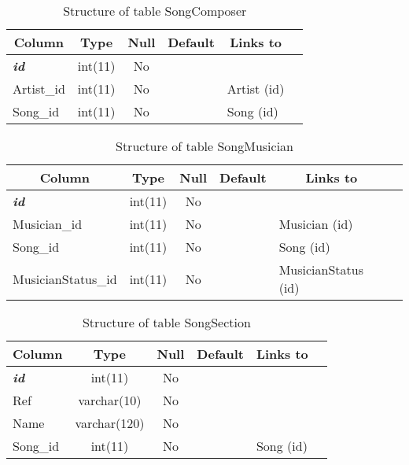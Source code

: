 %
%
 \begin{longtable}{|l|c|c|c|l|l|} 
 \caption{Structure of table SongComposer} \label{tab:SongComposer-structure} \\
 \hline \multicolumn{1}{|c|}{\textbf{Column}} & \multicolumn{1}{|c|}{\textbf{Type}} & \multicolumn{1}{|c|}{\textbf{Null}} & \multicolumn{1}{|c|}{\textbf{Default}} & \multicolumn{1}{|c|}{\textbf{Links to}} \\ \hline \hline
\textbf{\textit{id}} & int(11) & No &  &  \\ \hline 
Artist\_id & int(11) & No &  & Artist (id) \\ \hline 
Song\_id & int(11) & No &  & Song (id) \\ \hline 
 \end{longtable}

%
%
 \begin{longtable}{|l|c|c|c|l|l|} 
 \caption{Structure of table SongMusician} \label{tab:SongMusician-structure} \\
 \hline \multicolumn{1}{|c|}{\textbf{Column}} & \multicolumn{1}{|c|}{\textbf{Type}} & \multicolumn{1}{|c|}{\textbf{Null}} & \multicolumn{1}{|c|}{\textbf{Default}} & \multicolumn{1}{|c|}{\textbf{Links to}} \\ \hline \hline
\textbf{\textit{id}} & int(11) & No &  &  \\ \hline 
Musician\_id & int(11) & No &  & Musician (id) \\ \hline 
Song\_id & int(11) & No &  & Song (id) \\ \hline 
MusicianStatus\_id & int(11) & No &  & MusicianStatus (id) \\ \hline 
 \end{longtable}

%
%
 \begin{longtable}{|l|c|c|c|l|l|} 
 \caption{Structure of table SongSection} \label{tab:SongSection-structure} \\
 \hline \multicolumn{1}{|c|}{\textbf{Column}} & \multicolumn{1}{|c|}{\textbf{Type}} & \multicolumn{1}{|c|}{\textbf{Null}} & \multicolumn{1}{|c|}{\textbf{Default}} & \multicolumn{1}{|c|}{\textbf{Links to}} \\ \hline \hline
\textbf{\textit{id}} & int(11) & No &  &  \\ \hline 
Ref & varchar(10) & No &  &  \\ \hline 
Name & varchar(120) & No &  &  \\ \hline 
Song\_id & int(11) & No &  & Song (id) \\ \hline 
 \end{longtable}

